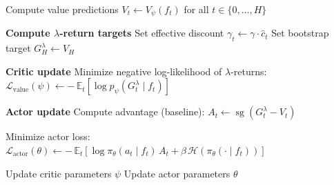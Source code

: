 \begin{algorithm}[htbp]
\caption*{Algorithm~\ref{alg:actor_critic} (continued)}


Compute value predictions $V_t \leftarrow V_\psi(f_t)$ for all $t \in \{0,\dots,H\}$\;

\BlankLine
\textbf{Compute $\lambda$-return targets}\;
Set effective discount $\gamma_t \leftarrow \gamma \cdot \hat c_t$\;
Set bootstrap target $G_H^\lambda \leftarrow V_H$\;




\BlankLine
\textbf{Critic update}\;
Minimize negative log-likelihood of $\lambda$-returns:\;
$\mathcal{L}_{\text{value}}(\psi)
\leftarrow
-\,\mathbb{E}_t\!\left[
\log p_\psi(G_t^\lambda \mid f_t)
\right]$\;

\BlankLine
\textbf{Actor update}\;
Compute advantage (baseline):
$A_t \leftarrow \operatorname{sg}(G_t^\lambda - V_t)$\;

Minimize actor loss:\;
$\mathcal{L}_{\text{actor}}(\theta)
\leftarrow
-\,\mathbb{E}_t\!\left[
\log \pi_\theta(a_t \mid f_t)\, A_t
+
\beta\, \mathcal{H}\!\left(\pi_\theta(\cdot \mid f_t)\right)
\right]$\;

Update critic parameters $\psi$\;
Update actor parameters $\theta$\;

\end{algorithm}


